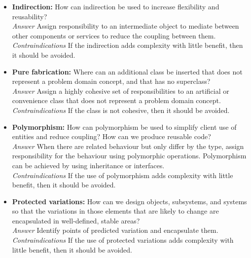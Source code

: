 \begin{itemize}
    \item \textbf{Indirection:} How can indirection be used to increase flexibility and reusability?\\
    \textit{Answer} Assign responsibility to an intermediate object to mediate between other components or services to reduce the coupling between them.\\
    \textit{Contraindications} If the indirection adds complexity with little benefit, then it should be avoided.
    \item \textbf{Pure fabrication:} Where can an additional class be inserted that does not represent a problem domain concept, and that has no superclass?\\
    \textit{Answer} Assign a highly cohesive set of responsibilities to an artificial or convenience class that does not represent a problem domain concept.\\
    \textit{Contraindications} If the class is not cohesive, then it should be avoided.
    \item \textbf{Polymorphism:} How can polymorphism be used to simplify client use of entities and reduce coupling? How can we produce reusable code?\\
    \textit{Answer} When there are related behaviour but only differ by the type, assign responsibility for the behaviour using polymorphic operations. Polymorphism can be achieved by using inheritance or interfaces.\\
    \textit{Contraindications} If the use of polymorphism adds complexity with little benefit, then it should be avoided.
    \item \textbf{Protected variations:} How can we design objects, subsystems, and systems so that the variations in those elements that are likely to change are encapsulated in well-defined, stable areas?\\
    \textit{Answer} Identify points of predicted variation and encapsulate them.\\
    \textit{Contraindications} If the use of protected variations adds complexity with little benefit, then it should be avoided.
\end{itemize}
